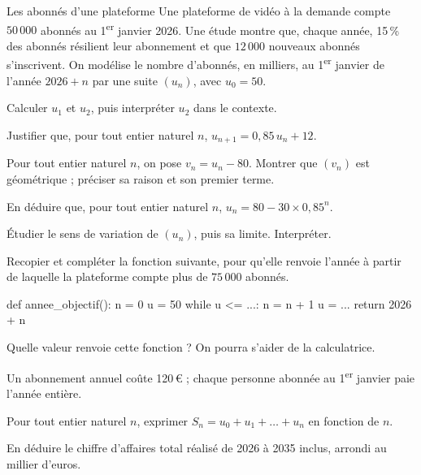 \begin{exercice}[3]{Les abonnés d'une plateforme}
Une plateforme de vidéo à la demande compte $50\,000$ abonnés au 1\textsuperscript{er} janvier 2026.
Une étude montre que, chaque année, 15\,\% des abonnés résilient leur abonnement et que $12\,000$
nouveaux abonnés s'inscrivent. On modélise le nombre d'abonnés, en milliers, au 1\textsuperscript{er} janvier
de l'année $2026+n$ par une suite $(u_n)$, avec $u_0=50$.
\begin{questions}
  \item Calculer $u_1$ et $u_2$, puis interpréter $u_2$ dans le contexte.
  \item Justifier que, pour tout entier naturel $n$, $u_{n+1}=0{,}85\,u_n+12$.
  \item Pour tout entier naturel $n$, on pose $v_n=u_n-80$. Montrer que $(v_n)$ est géométrique ;
    préciser sa raison et son premier terme.
  \item En déduire que, pour tout entier naturel $n$, $u_n=80-30\times0{,}85^{n}$.
  \item Étudier le sens de variation de $(u_n)$, puis sa limite. Interpréter.
\end{questions}
\begin{questions}[resume]
  \item Recopier et compléter la fonction suivante, pour qu'elle renvoie l'année à partir de laquelle
    la plateforme compte plus de $75\,000$ abonnés.
\begin{python}
def annee_objectif():
    n = 0
    u = 50
    while u <= ...:
        n = n + 1
        u = ...
    return 2026 + n
\end{python}
  \item Quelle valeur renvoie cette fonction ? On pourra s'aider de la calculatrice.
\end{questions}
Un abonnement annuel coûte 120\,€ ; chaque personne abonnée au 1\textsuperscript{er} janvier paie l'année entière.
\begin{questions}[resume]
  \item Pour tout entier naturel $n$, exprimer $S_n=u_0+u_1+\dots+u_n$ en fonction de $n$.
  \item En déduire le chiffre d'affaires total réalisé de 2026 à 2035 inclus, arrondi au millier d'euros.
\end{questions}
\end{exercice}

